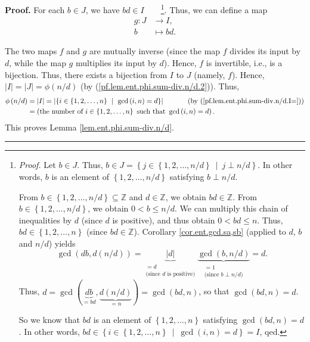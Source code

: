 \documentclass[numbers=enddot,12pt,final,onecolumn,notitlepage]{scrartcl}%
\numberwithin{exer}{subsection}
\theoremstyle{definition}
\newenvironment{proof}[1][Proof]{\noindent\textbf{#1.} }{\ \rule{0.5em}{0.5em}}
\begin{document}
\begin{proof}
For each $b\in J$, we have $bd\in I$\ \ \ \ \footnote{\textit{Proof.} Let
$b\in J$. Thus, $b\in J=\left\{  j\in\left\{  1,2,\ldots,n/d\right\}
\ \mid\ j\perp n/d\right\}  $. In other words, $b$ is an element of $\left\{
1,2,\ldots,n/d\right\}  $ satisfying $b\perp n/d$.
\par
From $b\in\left\{  1,2,\ldots,n/d\right\}  \subseteq\mathbb{Z}$ and
$d\in\mathbb{Z}$, we obtain $bd\in\mathbb{Z}$. From $b\in\left\{
1,2,\ldots,n/d\right\}  $, we obtain $0<b\leq n/d$. We can multiply this chain
of inequalities by $d$ (since $d$ is positive), and thus obtain $0<bd\leq n$.
Thus, $bd\in\left\{  1,2,\ldots,n\right\}  $ (since $bd\in\mathbb{Z}$).
Corollary \ref{cor.ent.gcd.sa,sb} (applied to $d$, $b$ and $n/d$) yields%
\[
\gcd\left(  db,d\left(  n/d\right)  \right)  =\underbrace{\left\vert
d\right\vert }_{\substack{=d\\\text{(since }d\text{ is positive)}%
}}\underbrace{\gcd\left(  b,n/d\right)  }_{\substack{=1\\\text{(since }b\perp
n/d\text{)}}}=d.
\]
Thus, $d=\gcd\left(  \underbrace{db}_{=bd},\underbrace{d\left(  n/d\right)
}_{=n}\right)  =\gcd\left(  bd,n\right)  $, so that $\gcd\left(  bd,n\right)
=d$.
\par
So we know that $bd$ is an element of $\left\{  1,2,\ldots,n\right\}  $
satisfying $\gcd\left(  bd,n\right)  =d$. In other words, $bd\in\left\{
i\in\left\{  1,2,\ldots,n\right\}  \ \mid\ \gcd\left(  i,n\right)  =d\right\}
=I$, qed.}. Thus, we can define a map%
\begin{align*}
g:J  &  \rightarrow I,\\
b  &  \mapsto bd.
\end{align*}


The two maps $f$ and $g$ are mutually inverse (since the map $f$ divides its
input by $d$, while the map $g$ multiplies its input by $d$). Hence, $f$ is
invertible, i.e., is a bijection. Thus, there exists a bijection from $I$ to
$J$ (namely, $f$). Hence, $\left\vert I\right\vert =\left\vert J\right\vert
=\phi\left(  n/d\right)  $ (by (\ref{pf.lem.ent.phi.sum-div.n/d.2})). Thus,%
\begin{align*}
\phi\left(  n/d\right)   &  =\left\vert I\right\vert =\left\vert \left\{
i\in\left\{  1,2,\ldots,n\right\}  \ \mid\ \gcd\left(  i,n\right)  =d\right\}
\right\vert \ \ \ \ \ \ \ \ \ \ \left(  \text{by
(\ref{pf.lem.ent.phi.sum-div.n/d.I=})}\right) \\
&  =\left(  \text{the number of }i\in\left\{  1,2,\ldots,n\right\}  \text{
such that }\gcd\left(  i,n\right)  =d\right)  .
\end{align*}
This proves Lemma \ref{lem.ent.phi.sum-div.n/d}.
\end{proof}
\end{document}
